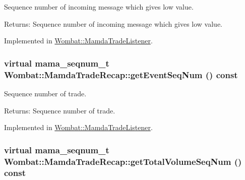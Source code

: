 Sequence number of incoming message which gives low value. 

\begin{Desc}
\item[Returns:]Sequence number of incoming message which gives low value. \end{Desc}


Implemented in \hyperlink{classWombat_1_1MamdaTradeListener_5b4c5e492cb7d005e416e21c7ef819f2}{Wombat::Mamda\-Trade\-Listener}.\hypertarget{classWombat_1_1MamdaTradeRecap_51ff9ff94e560b2dfbf16fd4ca64cdb6}{
\subsubsection[getEventSeqNum]{\setlength{\rightskip}{0pt plus 5cm}virtual mama\_\-seqnum\_\-t Wombat::Mamda\-Trade\-Recap::get\-Event\-Seq\-Num () const}}
\label{classWombat_1_1MamdaTradeRecap_51ff9ff94e560b2dfbf16fd4ca64cdb6}


Sequence number of trade. 

\begin{Desc}
\item[Returns:]Sequence number of trade. \end{Desc}


Implemented in \hyperlink{classWombat_1_1MamdaTradeListener_8289ac1ca750b7fb99e29c122e37caad}{Wombat::Mamda\-Trade\-Listener}.\hypertarget{classWombat_1_1MamdaTradeRecap_8474365e849b98332d5d9762347e5aae}{
\subsubsection[getTotalVolumeSeqNum]{\setlength{\rightskip}{0pt plus 5cm}virtual mama\_\-seqnum\_\-t Wombat::Mamda\-Trade\-Recap::get\-Total\-Volume\-Seq\-Num () const}}
\label{classWombat_1_1MamdaTradeRecap_8474365e849b98332d5d9762347e5aae}




